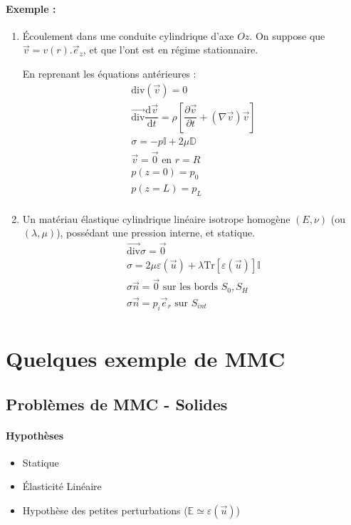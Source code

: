\documentclass{article}
\newcommand{\deriv}{\mathrm{d}}
\begin{document}
\paragraph{Exemple :}
\begin{enumerate}
\item Écoulement dans une conduite cylindrique d'axe $Oz$. On suppose que $\vec{v}=v(r).\vec{e}_z$, et que l'ont est en régime stationnaire.

En reprenant les équations antérieures : 
\begin{align*}
\text{div}(\vec{v}) = 0\\
\overrightarrow{\text{div}}\dfrac{\deriv \vec{v}}{\deriv t}=\rho [\dfrac{\partial \vec{v}}{\partial t} + (\nabla \vec{v})\vec{v}]\\
\sigma = -p \mathbb{I} + 2\mu \mathbb{D}\\
\vec{v}=\vec{0} \text{ en } r=R\\
p(z=0)=p_0\\
p(z=L)=p_L\\
\end{align*}

\item Un matériau élastique cylindrique linéaire isotrope homogène $(E,\nu)$ (ou $(\lambda, \mu)$), possédant une pression interne, et statique.
\begin{align*}
\overrightarrow{\text{div}}\sigma = \vec{0}\\
\sigma = 2\mu \varepsilon(\vec{u}) + \lambda \text{Tr}[\varepsilon(\vec{u})] \mathbb{I}\\
\sigma \vec{n}=\vec{0} \text{ sur les bords } S_0,S_H\\
\sigma \vec{n}=p_i\vec{e}_r \text{ sur } S_{int}\\
\end{align*}
\end{enumerate}

\section{Quelques exemple de MMC}
\subsection{Problèmes de MMC - Solides}
\paragraph{Hypothèses}
\begin{itemize}
\item Statique
\item Élasticité Linéaire
\item Hypothèse des petites perturbations ($\mathbb{E}\simeq \varepsilon (\vec{u})$)
\end{itemize}
\end{document}

